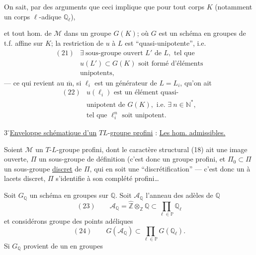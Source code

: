 On sait, par des arguments  que ceci implique que pour tout  corps $K$  (notamment un corps $\ell$-adique $\mathbb{Q}_{\ell}$),


et tout hom. de $\mathcal{M}$ dans un groupe $G(K)$; où $G$ est un schéma en groupes de t.f. affine sur $K$; 
la restriction de $u$ à $L$ est ``quasi-unipotente'', i.e.
\[
\begin{array}{ll}
(21)&\exists\ \text{sous-groupe ouvert }L'\text{ de }L,\text{ tel que}\\
&u(L')\subset G(K)\text{ soit formé d'éléments}\\
&\text{unipotents},
\end{array}
\]
--- ce qui revient au $\overline{\mathrm m}$, si $\ell_i$ est un générateur de $L=L_i$, qu'on ait
\[
\begin{array}{ll}
(22)&u(\ell_i)\text{ est un élément quasi-}\\
&\text{unipotent de }G(K),\text{ i.e. }\exists\ n\in\mathbb{N}^{*},\\
&\text{tel que }\ell_i^{n}\text{ soit unipotent}.
\end{array}
\]


\textcircled{\(3^\circ\)}\quad \uline{Enveloppe schématique d'un} \(T\)\unsure{-}\(L\)-\uline{groupe profini} :  \uline{Les hom. admissibles.}

Soient \(\mathcal{M}\) un \(T\)-\(L\)-groupe profini, dont le caractère structural (18)
ait une image ouverte, \(\Pi\) un sous-groupe de définition  (c'est donc un groupe  profini\unsure{)|]}, et \(\Pi_0\subset\Pi\) un sous-groupe \uline{discret} de \(\Pi\), qui en soit une ``discrétification'' --- c'est donc un  à lacets discret,  \(\Pi\) s'identifie à son complété profini\ldots

Soit \(G_{\mathbb{Q}}\) un schéma en groupes  sur \(\mathbb{Q}\). Soit \(\mathcal{A}_{\mathbb{Q}}\) l'anneau des adèles de \(\mathbb{Q}\)
\[
(23)\qquad \mathcal{A}_{\mathbb{Q}}=\widehat{\mathbb{Z}}\otimes_{\mathbb{Z}}\mathbb{Q}\subset\prod_{\ell\in\mathbb{P}}\mathbb{Q}_{\ell}
\]
et considérons  groupe des points adéliques
\[
(24)\qquad G(\mathcal{A}_{\mathbb{Q}})\subset\prod_{\ell\in\mathbb{P}}G(\mathbb{Q}_{\ell}).
\]
Si \(G_{\mathbb{Q}}\) provient de un  en groupes

